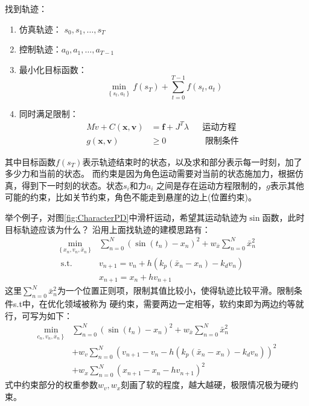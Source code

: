 \documentclass[lang=cn,newtx,10pt,scheme=chinese]{elegantbook}
\begin{document}
找到轨迹：
\begin{enumerate}[itemindent=2em]
  \item 仿真轨迹： $s_0, s_1, \ldots, s_T$
  \item 控制轨迹：$a_0, a_1, \ldots, a_{T-1}$
  \item 最小化目标函数：$$\min _{\left\{s_t, a_t\right\}} f\left(s_T\right)+\sum_{t=0}^{T-1} f\left(s_t, a_t\right)$$
  \item 同时满足限制：
  $$
  \begin{aligned}
  M \dot{v}+C(\boldsymbol{x}, \boldsymbol{v}) & =\boldsymbol{f}+J^T \lambda & & \text {运动方程} \\
  g(\boldsymbol{x}, \boldsymbol{v}) & \geq 0 & & \text { 限制条件 }
  \end{aligned}
  $$
\end{enumerate}
其中目标函数$f(s_T)$表示轨迹结束时的状态，以及求和部分表示每一时刻，加了多少力和当前的状态。
而约束是因为角色运动需要对当前的状态施加力，根据仿真，得到下一时刻的状态。状态$s_i$和力$a_i$
之间是存在运动方程限制的，$g$表示其他可能的约束，比如关节约束，角色不能走到悬崖的边上(位置约束)。

举个例子，对图\ref{fig:CharacterPD}中滑杆运动，希望其运动轨迹为$\sin$函数，此时目标轨迹应该为什么？
沿用上面找轨迹的建模思路有：
\begin{equation}
  \begin{array}{ll}
  \min _{\left\{x_n, v_n, \bar{x}_n\right\}} & \sum_{n=0}^N\left(\sin \left(t_n\right)-x_n\right)^2+w_{\bar{x}} \sum_{n=0}^N \bar{x}_n^2 \\
  \text { s.t. } & v_{n+1}=v_n+h\left(k_p\left(\bar{x}_n-x_n\right)-k_d v_n\right) \\
  & x_{n+1}=x_n+h v_{n+1}
  \end{array}
\end{equation}
这里$\sum_{n=0}^N \bar{x}_n^2$为一个位置正则项，限制其值比较小，使得轨迹比较平滑。限制条件s.t中，在优化领域被称为
硬约束，需要两边一定相等，软约束即为两边约等就行，可写为如下：
\begin{equation}
  \begin{aligned}
  \min _{\left.c_n, v_n, \bar{x}_n\right\}} & \sum_{n=0}^N\left(\sin \left(t_n\right)-x_n\right)^2+w_{\bar{x}} \sum_{n=0}^N \bar{x}_n^2 \\
  & +w_v \sum_{n=0}^N\left(v_{n+1}-v_n-h\left(k_p\left(\bar{x}_n-x_n\right)-k_d v_n\right)\right)^2 \\
  & +w_x \sum_{n=0}^N\left(x_{n+1}-x_n-h v_{n+1}\right)^2
  \end{aligned}
\end{equation}
式中约束部分的权重参数$w_v,w_x$刻画了软的程度，越大越硬，极限情况极为硬约束。
\end{document}
